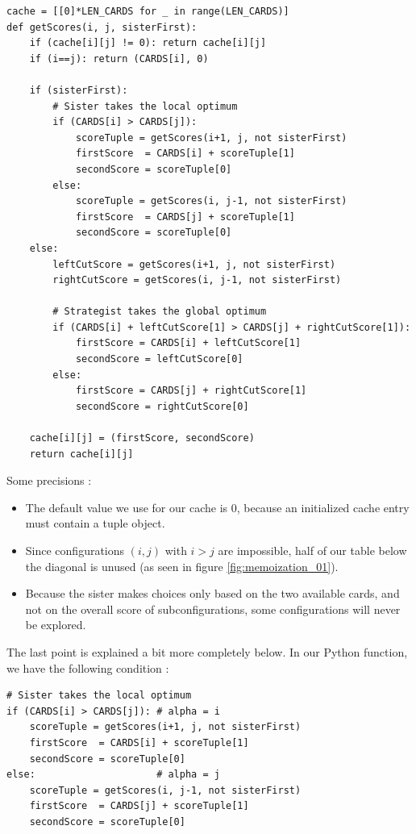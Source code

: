 \documentclass[a4paper,12pt,fleqn]{article}
\begin{document}
\begin{verbatim}
cache = [[0]*LEN_CARDS for _ in range(LEN_CARDS)]
def getScores(i, j, sisterFirst):
    if (cache[i][j] != 0): return cache[i][j]
    if (i==j): return (CARDS[i], 0)

    if (sisterFirst):
        # Sister takes the local optimum
        if (CARDS[i] > CARDS[j]):
            scoreTuple = getScores(i+1, j, not sisterFirst)
            firstScore  = CARDS[i] + scoreTuple[1]
            secondScore = scoreTuple[0]
        else:
            scoreTuple = getScores(i, j-1, not sisterFirst)
            firstScore  = CARDS[j] + scoreTuple[1]
            secondScore = scoreTuple[0]
    else:
        leftCutScore = getScores(i+1, j, not sisterFirst)
        rightCutScore = getScores(i, j-1, not sisterFirst)

        # Strategist takes the global optimum
        if (CARDS[i] + leftCutScore[1] > CARDS[j] + rightCutScore[1]):
            firstScore = CARDS[i] + leftCutScore[1]
            secondScore = leftCutScore[0]
        else:
            firstScore = CARDS[j] + rightCutScore[1]
            secondScore = rightCutScore[0]
    
    cache[i][j] = (firstScore, secondScore)
    return cache[i][j]
\end{verbatim}

Some precisions :
\begin{itemize}
    \item The default value we use for our cache is 0, because an initialized cache entry must contain a tuple object.
    \item Since configurations $(i,j)$ with $i > j$ are impossible, half of our table below the diagonal is unused (as seen in figure \ref{fig:memoization_01}).
    \item Because the sister makes choices only based on the two available cards, and not on the overall score of subconfigurations, some configurations will never be explored.
\end{itemize}

The last point is explained a bit more completely below. In our Python function, we have the following condition :

\begin{verbatim}
# Sister takes the local optimum
if (CARDS[i] > CARDS[j]): # alpha = i
    scoreTuple = getScores(i+1, j, not sisterFirst)
    firstScore  = CARDS[i] + scoreTuple[1]
    secondScore = scoreTuple[0]
else:                     # alpha = j
    scoreTuple = getScores(i, j-1, not sisterFirst)
    firstScore  = CARDS[j] + scoreTuple[1]
    secondScore = scoreTuple[0]
\end{verbatim}
\end{document}
